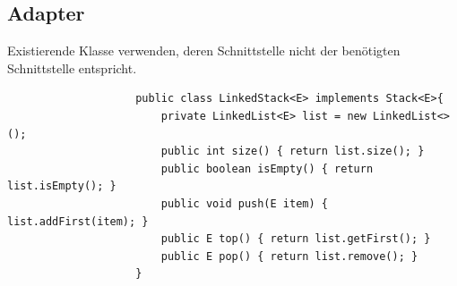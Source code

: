 \documentclass[a4paper, landscape, 8pt]{scrartcl}
\begin{document}
\begin{multicols*}{4}
            \subsection{Adapter}
                Existierende Klasse verwenden, deren Schnittstelle nicht der benötigten Schnittstelle entspricht.\\
                \begin{lstlisting}
                    public class LinkedStack<E> implements Stack<E>{
                        private LinkedList<E> list = new LinkedList<>();
                        public int size() { return list.size(); }
                        public boolean isEmpty() { return list.isEmpty(); }
                        public void push(E item) { list.addFirst(item); }
                        public E top() { return list.getFirst(); }
                        public E pop() { return list.remove(); }
                    }
                \end{lstlisting}

\end{multicols*}
\end{document}

